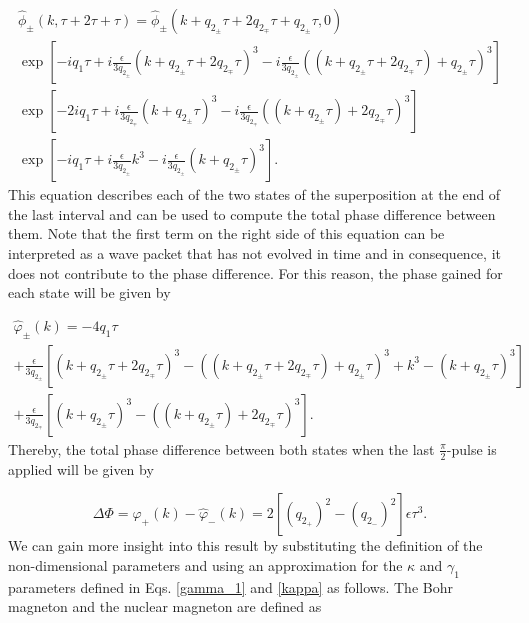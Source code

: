 \documentclass{article}
\begin{document}
\begin{multline}\label{state_t3_momentum_space_final}
\widehat{\phi}_{\pm}(k, \tau+2\tau+\tau) = \widehat{\phi}_{\pm}(k + q_{2_{\pm}}\tau + 2q_{2_{\mp}}\tau + q_{2_{\pm}}\tau , 0) \\ 
\exp\left[-i q_{1} \tau + i \frac{\epsilon}{3q_{2_{\pm}}} (k+ q_{2_{\pm}}\tau + 2q_{2_{\mp}}\tau)^{3} - i \frac{\epsilon}{3q_{2_{\pm}}} ((k+q_{2_{\pm}}\tau + 2q_{2_{\mp}}\tau) + q_{2_{\pm}} \tau)^{3} \right] \\
\exp\left[-2i q_{1} \tau + i \frac{\epsilon}{3q_{2_{\mp}}} (k+q_{2_{\pm}}\tau)^{3} - i \frac{\epsilon}{3q_{2_{\mp}}} ((k+ q_{2_{\pm}}\tau) + 2q_{2_{\mp}} \tau)^{3} \right] \\
\exp\left[-i q_{1} \tau + i \frac{\epsilon}{3q_{2_{\pm}}} k^{3} - i \frac{\epsilon}{3q_{2_{\pm}}} (k + q_{2_{\pm}} \tau)^{3} \right].
\end{multline}
%
This equation describes each of the two states of the superposition at the end of the last interval and can be used to compute the total phase difference between them. Note that the first term on the right side of this equation can be interpreted as a wave packet that has not evolved in time and in consequence, it does not contribute to the phase difference. For this reason, the phase gained for each state will be given by

\begin{multline}\label{phase_momentum_space}
\widehat{\varphi}_{\pm}(k) = -4q_{1}\tau \\
+ \frac{\epsilon}{3q_{2_{\pm}}} \left[(k+ q_{2_{\pm}}\tau + 2q_{2_{\mp}}\tau)^{3} - ((k+q_{2_{\pm}}\tau + 2q_{2_{\mp}}\tau) + q_{2_{\pm}} \tau)^{3} + k^{3} - (k+q_{2_{\pm}}\tau)^{3} \right] \\
+ \frac{\epsilon}{3q_{2_{\mp}}} \left[(k+q_{2_{\pm}}\tau)^{3} - ((k+q_{2_{\pm}}\tau)+2q_{2_{\mp}}\tau)^{3} \right].
\end{multline}
%
Thereby, the total phase difference between both states when the last $\frac{\pi}{2}$-pulse is applied will be given by

\begin{equation}
\Delta \Phi = \widehat{\varphi}_{+}(k) - \widehat{\varphi}_{-}(k) = 2\left[(q_{2_{+}})^{2} - (q_{2_{-}})^{2} \right]\epsilon \tau^{3} .
\end{equation}
%
We can gain more insight into this result by substituting the definition of the non-dimensional parameters and using an approximation for the $\kappa$ and $\gamma_1$ parameters defined in Eqs. \ref{gamma_1} and \ref{kappa} as follows. The Bohr magneton and the nuclear magneton are defined as
\end{document}
